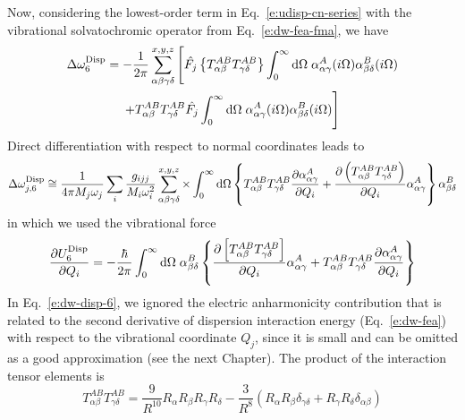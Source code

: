 \documentclass[a4paper,titlepage,twoside,fleqn,12pt]{book}
\newcommand{\fderiv}[2]{\ensuremath{
    \frac{\partial #1}{\partial #2}}}
\begin{document}
\begin{refsection}
Now, considering the lowest\hyp{}order term in Eq.~\eqref{e:udisp-cn-series} 
with the vibrational solvatochromic operator from Eq.~\eqref{e:dw-fea-fma}, we have
%
\begin{multline}
   \Delta\omega^{\rm Disp}_6 = - \frac{1}{2\pi} \sum_{\alpha\beta\gamma\delta}^{x,y,z} 
   \Bigg[ 
   \hat{F_j} \left\{ T^{AB}_{\alpha\beta}T^{AB}_{\gamma\delta} \right\} \int_0^{\infty} {\rm d}\Omega \; 
    \alpha^A_{\alpha\gamma}(i\Omega)\alpha^B_{\beta\delta}(i\Omega) \\
   + 
   T^{AB}_{\alpha\beta}T^{AB}_{\gamma\delta} \hat{F_j} \int_0^{\infty} {\rm d}\Omega \;
   \alpha^A_{\alpha\gamma}(i\Omega)\alpha^B_{\beta\delta}(i\Omega) 
   \Bigg]
\end{multline}
%
Direct differentiation with respect to normal coordinates leads to 
%
\begin{equation} \label{e:dw-disp-6}
 \Delta\omega_{j,6}^{\rm Disp} \cong 
\frac{1}{4\pi M_j\omega_j}\sum_i \frac{g_{ijj}}{M_i\omega_i^2} 
\sum_{\alpha\beta\gamma\delta}^{x,y,z}   \times \int_{0}^{\infty} {\rm d}\Omega
%
 \left\{
T^{AB}_{\alpha\beta}T^{AB}_{\gamma\delta}
\frac{\partial \alpha_{\alpha\gamma}^{A}}{\partial Q_i}
+
\frac{\partial \left(T^{AB}_{\alpha\beta}T^{AB}_{\gamma\delta}\right)}{\partial Q_i}
\alpha_{\alpha\gamma}^{A}
\right\}
\alpha_{\beta\delta}^{B}
\end{equation}
%
in which we used the vibrational force 
%
\begin{equation} \label{e:vibr-force-disp-6}
 \fderiv{U^{\rm Disp}_6}{Q_i} = -\frac{\hbar}{2\pi} \int_0^\infty {\rm d}\Omega \;
 \alpha^B_{\beta\delta}
 \left\{
     \fderiv{\left[T^{AB}_{\alpha\beta}T^{AB}_{\gamma\delta}\right]}{Q_i} 
         \alpha^A_{\alpha\gamma}
      + 
     T^{AB}_{\alpha\beta}T^{AB}_{\gamma\delta} \fderiv{\alpha^A_{\alpha\gamma}}{Q_i}
 \right\}
\end{equation}
%
In Eq.~\eqref{e:dw-disp-6}, we ignored the electric anharmonicity contribution 
that is related to the second derivative of dispersion interaction energy 
(Eq.~\eqref{e:dw-fea}) with respect to the vibrational coordinate $Q_j$, 
since it is small and can be omitted as a good approximation 
(see the next Chapter). 
The product of the interaction tensor elements is
%
\begin{equation} \label{e:378463267}
 T^{AB}_{\alpha\beta} T^{AB}_{\gamma\delta} = \frac{9}{R^{10}} R_\alpha R_\beta R_\gamma R_\delta
 - \frac{3}{R^8} \left( R_\alpha R_\beta \delta_{\gamma\delta} + R_\gamma R_\delta \delta_{\alpha\beta}\right)

\end{equation}
\end{refsection}
\end{document}
